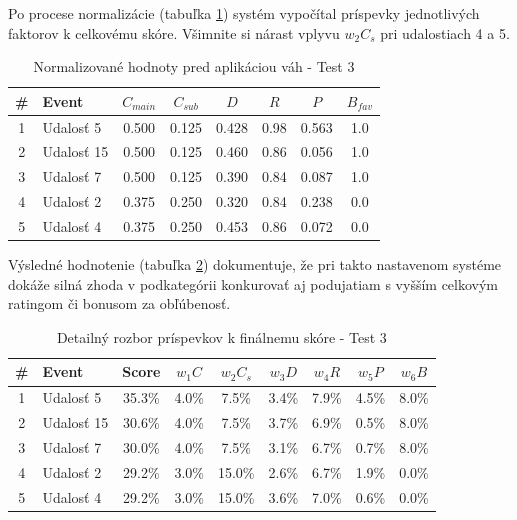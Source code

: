 \documentclass[12pt,a4paper]{article}
\begin{document}
Po procese normalizácie (tabuľka \ref{tab:norm_test3}) systém vypočítal príspevky jednotlivých faktorov k celkovému skóre. Všimnite si nárast vplyvu $w_2 C_s$ pri udalostiach 4 a 5.

\begin{table}[H]
\centering
\small
\begin{tabular}{|c|l|c|c|c|c|c|c|}
\hline
\textbf{\#} & \textbf{Event} & $C_{main}$ & $C_{sub}$ & $D$ & $R$ & $P$ & $B_{fav}$ \\
\hline
1 & Udalosť 5  & 0.500 & 0.125 & 0.428 & 0.98 & 0.563 & 1.0 \\
2 & Udalosť 15 & 0.500 & 0.125 & 0.460 & 0.86 & 0.056 & 1.0 \\
3 & Udalosť 7  & 0.500 & 0.125 & 0.390 & 0.84 & 0.087 & 1.0 \\
4 & Udalosť 2  & 0.375 & 0.250 & 0.320 & 0.84 & 0.238 & 0.0 \\
5 & Udalosť 4  & 0.375 & 0.250 & 0.453 & 0.86 & 0.072 & 0.0 \\
\hline
\end{tabular}
\caption{Normalizované hodnoty pred aplikáciou váh - Test 3}
\label{tab:norm_test3}
\end{table}

Výsledné hodnotenie (tabuľka \ref{tab:vysledky_test3}) dokumentuje, že pri takto nastavenom systéme dokáže silná zhoda v podkategórii konkurovať aj podujatiam s vyšším celkovým ratingom či bonusom za obľúbenosť.

\begin{table}[H]
\centering
\small
\begin{tabular}{|c|l|c|c|c|c|c|c|c|}
\hline
\textbf{\#} & \textbf{Event} & \textbf{Score} & $w_1 C$ & $w_2 C_s$ & $w_3 D$ & $w_4 R$ & $w_5 P$ & $w_6 B$ \\
\hline
1 & Udalosť 5  & 35.3\% & 4.0\% & 7.5\%  & 3.4\% & 7.9\% & 4.5\% & 8.0\% \\
2 & Udalosť 15 & 30.6\% & 4.0\% & 7.5\%  & 3.7\% & 6.9\% & 0.5\% & 8.0\% \\
3 & Udalosť 7  & 30.0\% & 4.0\% & 7.5\%  & 3.1\% & 6.7\% & 0.7\% & 8.0\% \\
4 & Udalosť 2  & 29.2\% & 3.0\% & 15.0\% & 2.6\% & 6.7\% & 1.9\% & 0.0\% \\
5 & Udalosť 4  & 29.2\% & 3.0\% & 15.0\% & 3.6\% & 7.0\% & 0.6\% & 0.0\% \\
\hline
\end{tabular}
\caption{Detailný rozbor príspevkov k finálnemu skóre - Test 3}
\label{tab:vysledky_test3}
\end{table}
\end{document}
